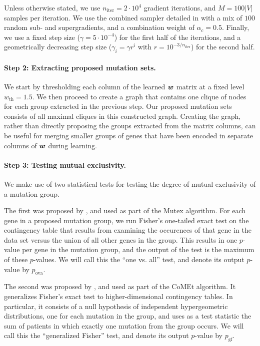 Unless otherwise stated, we use $n_{\mathrm{iter}} = 2\cdot10^4$ gradient iterations, and $M = 100|V|$ samples per iteration.
We use the combined sampler detailed in  with a mix of $100$ random sub- and supergradients, and a combination weight of $\alpha_c = 0.5$.
Finally, we use a fixed step size ($\gamma = 5\cdot10^{-4}$) for the first half of the iterations, and a geometrically decreasing step size ($\gamma_i = \gamma r^i$ with $r = 10^{-3/n_{\mathrm{iter}}}$) for the second half.

\paragraph{Step 2: Extracting proposed mutation sets.}
We start by thresholding each column of the learned $\bm{w}$ matrix at a fixed level $w_{\mathrm{th}} = 1.5$.
We then proceed to create a graph that contains one clique of nodes for each group extracted in the previous step.
Our proposed mutation sets consists of all maximal cliques in this constructed graph.
Creating the graph, rather than directly proposing the groups extracted from the matrix columns, can be useful for merging smaller groups of genes that have been encoded in separate columns of $\bm{w}$ during learning.

\paragraph{Step 3: Testing mutual exclusivity.}
We make use of two statistical tests for testing the degree of mutual exclusivity of a mutation group.

The first was proposed by \cite{mutex}, and used as part of the Mutex algorithm.
For each gene in a proposed mutation group, we run Fisher's one-tailed exact test on the contingency table that results from examining the occurences of that gene in the data set versus the union of all other genes in the group.
This results in one $p$-value per gene in the mutation group, and the output of the test is the maximum of these $p$-values.
We will call this the ``one vs. all'' test, and denote its output $p$-value by $p_{\mathrm{ova}}$.

The second was proposed by \cite{comet}, and used as part of the CoMEt algorithm.
It generalizes Fisher's exact test to higher-dimensional contingency tables.
In particular, it consists of a null hypothesis of independent hypergeometric distributions, one for each mutation in the group, and uses as a test statistic the sum of patients in which exactly one mutation from the group occurs.
We will call this the ``generalized Fisher'' test, and denote its output $p$-value by $p_{\mathrm{gf}}$.


